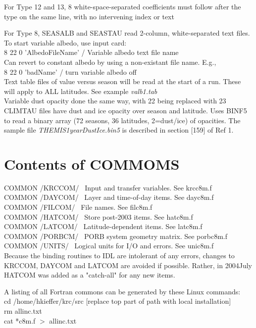 \documentclass{article}
\newcommand{\qi}{\\ \hspace*{2.em}}      %
\newcommand{\nf}{\textit}  %
\begin{document}
For Type 12 and 13, 8 white-space-separated coefficients must follow after 
the type on the same line, with no intervening index or text 

For Type 8, SEASALB and SEASTAU read 2-column, white-separated text files. \\
To start variable albedo, use input card: 
\qi  8 22 0 'AlbedoFileName' / Variable albedo text file name \\
Can revert to constant albedo by using a non-existant file name. E.g.,
\qi  8 22 0 'badName' / turn variable albedo off \\
Text table files of value versus season will be read at the start of a
run. These will apply to ALL latitudes. See example  \nf{valb1.tab}   \\
Variable dust opacity done the same way, with 22 being replaced with 23 \\

CLIMTAU files have dust and ice opacity over season and latitude. Uses BINF5 to
read a binary array (72 seasons, 36 latitudes, 2=dust/ice) of opacities. The
sample file \nf{THEMIS1yearDustIce.bin5} is described in section [159] of Ref 1.
 
\section{Contents of COMMOMS } %
 COMMON /KRCCOM/ \ Input and transfer variables. See krcc8m.f  
\\ COMMON /DAYCOM/ \ Layer and time-of-day items. See dayc8m.f  
\\ COMMON /FILCOM/ \ File names. See filc8m.f  
\\ COMMON /HATCOM/ \ Store post-2003 items. See hatc8m.f  
\\ COMMON /LATCOM/ \ Latitude-dependent items. See latc8m.f  
\\ COMMON /PORBCM/ \ PORB system geometry matrix.  See porbc8m.f  
\\ COMMON /UNITS/ \ Logical units for I/O and errors.  See unic8m.f  \\

Because the binding routines to IDL are intolerant of any errors, changes to
KRCCOM, DAYCOM and LATCOM are avoided if possible. Rather, in 2004July HATCOM
was added as a "catch-all" for any new items.

A listing of all Fortran commons can be generated by these Linux commands: \\ 
cd /home/hkieffer/krc/src [replace top part of path with local installation] \\ 
rm allinc.txt \\ 
cat  *c8m.f $>$ allinc.txt 
              
\end{document}
